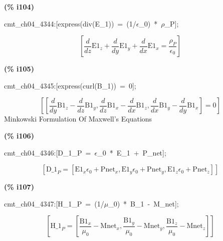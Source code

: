 \documentclass[fleqn]{article}
\begin{document}
\noindent
\begin{minipage}[t]{4.000000em}\color{red}\bfseries
(\% i104)	
\end{minipage}
\begin{minipage}[t]{\textwidth}\color{blue}
cmt\_ch04\_4344:[express(div(E\_1))\ =\ (1/\ensuremath{\epsilon}\_0)\ *\ \ensuremath{\rho}\_P];
\end{minipage}
\[\displaystyle \tag{\% o104} 
\left[ \frac{d}{d z} {{\ensuremath{\mathrm{E1}}}_z}+\frac{d}{d y} {{\ensuremath{\mathrm{E1}}}_y}+\frac{d}{d x} {{\ensuremath{\mathrm{E1}}}_x}=\frac{{{\rho }_P}}{{{\epsilon }_0}}\right] \mbox{}
\]


\noindent
\begin{minipage}[t]{4.000000em}\color{red}\bfseries
(\% i105)	
\end{minipage}
\begin{minipage}[t]{\textwidth}\color{blue}
cmt\_ch04\_4345:[express(curl(B\_1))\ =\ 0];
\end{minipage}
\[\displaystyle \tag{\% o105} 
\left[ \left[ \frac{d}{d y} {{\ensuremath{\mathrm{B1}}}_z}-\frac{d}{d z} {{\ensuremath{\mathrm{B1}}}_y}\operatorname{,}\frac{d}{d z} {{\ensuremath{\mathrm{B1}}}_x}-\frac{d}{d x} {{\ensuremath{\mathrm{B1}}}_z}\operatorname{,}\frac{d}{d x} {{\ensuremath{\mathrm{B1}}}_y}-\frac{d}{d y} {{\ensuremath{\mathrm{B1}}}_x}\right] =0\right] \mbox{}
\]
Minkowski Formulation Of Maxwell's Equations


\noindent
\begin{minipage}[t]{4.000000em}\color{red}\bfseries
(\% i106)	
\end{minipage}
\begin{minipage}[t]{\textwidth}\color{blue}
cmt\_ch04\_4346:[D\_1\_P\ =\ \ensuremath{\epsilon}\_0\ *\ E\_1\ +\ P\_net];
\end{minipage}
\[\displaystyle \tag{\% o106} 
\left[ {{\ensuremath{\mathrm{D\_ 1}}}_P}=\left[ {{\ensuremath{\mathrm{E1}}}_x} {{\epsilon }_0}+{{\ensuremath{\mathrm{Pnet}}}_x}\operatorname{,}{{\ensuremath{\mathrm{E1}}}_y} {{\epsilon }_0}+{{\ensuremath{\mathrm{Pnet}}}_y}\operatorname{,}{{\ensuremath{\mathrm{E1}}}_z} {{\epsilon }_0}+{{\ensuremath{\mathrm{Pnet}}}_z}\right] \right] \mbox{}
\]


\noindent
\begin{minipage}[t]{4.000000em}\color{red}\bfseries
(\% i107)	
\end{minipage}
\begin{minipage}[t]{\textwidth}\color{blue}
cmt\_ch04\_4347:[H\_1\_P\ =\ (1/\ensuremath{\mu}\_0)\ *\ B\_1\ -\ M\_net];
\end{minipage}
\[\displaystyle \tag{\% o107} 
\left[ {{\ensuremath{\mathrm{H\_ 1}}}_P}=\left[ \frac{{{\ensuremath{\mathrm{B1}}}_x}}{{{\mu }_0}}-{{\ensuremath{\mathrm{Mnet}}}_x}\operatorname{,}\frac{{{\ensuremath{\mathrm{B1}}}_y}}{{{\mu }_0}}-{{\ensuremath{\mathrm{Mnet}}}_y}\operatorname{,}\frac{{{\ensuremath{\mathrm{B1}}}_z}}{{{\mu }_0}}-{{\ensuremath{\mathrm{Mnet}}}_z}\right] \right] \mbox{}
\]
\end{document}
